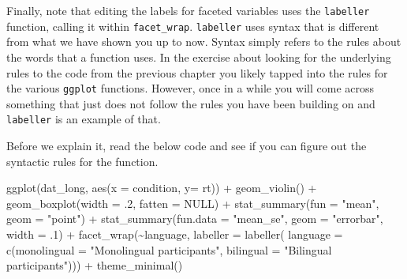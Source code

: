 \documentclass[
  english,
  doc,floatsintext]{apa6}
\newenvironment{Shaded}{\begin{snugshade}}{\end{snugshade}}
\newcommand{\AttributeTok}[1]{\textcolor[rgb]{0.77,0.63,0.00}{#1}}
\newcommand{\ConstantTok}[1]{\textcolor[rgb]{0.00,0.00,0.00}{#1}}
\newcommand{\DecValTok}[1]{\textcolor[rgb]{0.00,0.00,0.81}{#1}}
\newcommand{\FunctionTok}[1]{\textcolor[rgb]{0.00,0.00,0.00}{#1}}
\newcommand{\NormalTok}[1]{#1}
\newcommand{\SpecialCharTok}[1]{\textcolor[rgb]{0.00,0.00,0.00}{#1}}
\newcommand{\StringTok}[1]{\textcolor[rgb]{0.31,0.60,0.02}{#1}}
\begin{document}
Finally, note that editing the labels for faceted variables uses the \texttt{labeller} function, calling it within \texttt{facet\_wrap}. \texttt{labeller} uses syntax that is different from what we have shown you up to now. Syntax simply refers to the rules about the words that a function uses. In the exercise about looking for the underlying rules to the code from the previous chapter you likely tapped into the rules for the various \texttt{ggplot} functions. However, once in a while you will come across something that just does not follow the rules you have been building on and \texttt{labeller} is an example of that.

Before we explain it, read the below code and see if you can figure out the syntactic rules for the function.

\begin{Shaded}
\begin{Highlighting}[]
\FunctionTok{ggplot}\NormalTok{(dat\_long, }\FunctionTok{aes}\NormalTok{(}\AttributeTok{x =}\NormalTok{ condition, }\AttributeTok{y=}\NormalTok{ rt)) }\SpecialCharTok{+}
  \FunctionTok{geom\_violin}\NormalTok{() }\SpecialCharTok{+}
  \FunctionTok{geom\_boxplot}\NormalTok{(}\AttributeTok{width =}\NormalTok{ .}\DecValTok{2}\NormalTok{, }\AttributeTok{fatten =} \ConstantTok{NULL}\NormalTok{) }\SpecialCharTok{+}
  \FunctionTok{stat\_summary}\NormalTok{(}\AttributeTok{fun =} \StringTok{"mean"}\NormalTok{, }\AttributeTok{geom =} \StringTok{"point"}\NormalTok{) }\SpecialCharTok{+}
  \FunctionTok{stat\_summary}\NormalTok{(}\AttributeTok{fun.data =} \StringTok{"mean\_se"}\NormalTok{, }\AttributeTok{geom =} \StringTok{"errorbar"}\NormalTok{, }\AttributeTok{width =}\NormalTok{ .}\DecValTok{1}\NormalTok{) }\SpecialCharTok{+}
  \FunctionTok{facet\_wrap}\NormalTok{(}\SpecialCharTok{\textasciitilde{}}\NormalTok{language, }
             \AttributeTok{labeller =} \FunctionTok{labeller}\NormalTok{(}
               \AttributeTok{language =} \FunctionTok{c}\NormalTok{(}\AttributeTok{monolingual =} \StringTok{"Monolingual participants"}\NormalTok{,}
                             \AttributeTok{bilingual =} \StringTok{"Bilingual participants"}\NormalTok{))) }\SpecialCharTok{+}
  \FunctionTok{theme\_minimal}\NormalTok{()}
\end{Highlighting}
\end{Shaded}
\end{document}
